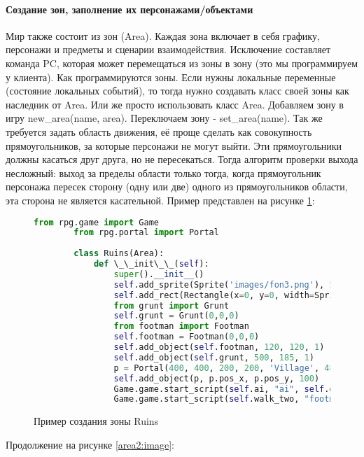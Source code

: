 \paragraph{Создание зон, заполнение их персонажами/объектами}
Мир также состоит из зон (Area). Каждая зона включает в себя графику, персонажи и предметы и сценарии взаимодействия. Исключение составляет команда PC, которая может перемещаться из зоны в зону (это мы программируем у клиента). Как программируются зоны. Если нужны локальные переменные (состояние локальных событий), то тогда нужно создавать класс своей зоны как наследник от Area. Или же просто использовать класс Area. Добавляем зону в игру new\_area(name, area). Переключаем зону - set\_area(name). Так же требуется задать область движения, её проще сделать как совокупность прямоугольников, за которые персонажи не могут выйти. Эти прямоугольники должны касаться друг друга, но не пересекаться. Тогда алгоритм проверки выхода несложный: выход за пределы области только тогда, когда прямоугольник персонажа пересек сторону (одну или две) одного из прямоугольников области, эта сторона не является касательной.
Пример представлен на рисунке \ref{area:image}:
\begin{figure}[H]
	\begin{lstlisting}[language=Python]
		from rpg.game import Game
		from rpg.portal import Portal
		
		class Ruins(Area):
			def \_\_init\_\_(self):
				super().__init__()
				self.add_sprite(Sprite('images/fon3.png'), 590, 400, 0)
				self.add_rect(Rectangle(x=0, y=0, width=Sprite('images/fon3.png').image.width(), height=Sprite('images/fon3.png').image.height()))
				from grunt import Grunt
				self.grunt = Grunt(0,0,0)
				from footman import Footman
				self.footman = Footman(0,0,0)
				self.add_object(self.footman, 120, 120, 1)
				self.add_object(self.grunt, 500, 185, 1)
				p = Portal(400, 400, 200, 200, 'Village', 480, 100)
				self.add_object(p, p.pos_x, p.pos_y, 100)
				Game.game.start_script(self.ai, "ai", self.grunt)
				Game.game.start_script(self.walk_two, "footman", 50, 50)		
	\end{lstlisting}  
\caption{Пример создания зоны Ruins}
\label{area:image}
\end{figure}
Продолжение на рисунке \ref{area2:image}:
